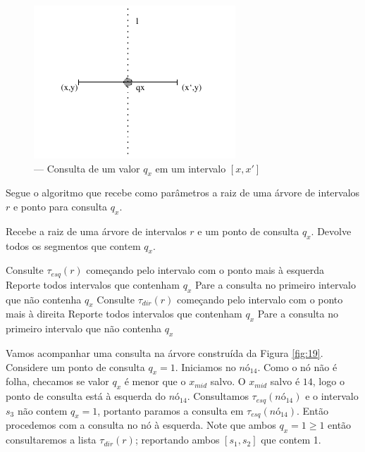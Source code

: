 \begin{figure}[h!]
    \begin{center}
        \includegraphics[scale=1.5]{images/interval_tree_query.pdf}
    \end{center}
    \caption{ — Consulta de um valor $q_x$ em um intervalo $[x, x']$}
    \label{fig:20}
\end{figure}


Segue o algoritmo que recebe como parâmetros a raiz de uma árvore de intervalos $r$ e ponto para consulta $q_x$.

\begin{algorithm}[h!]
    \caption{Recebe a raiz de uma árvore de intervalos $r$ e um ponto de consulta $q_x$. Devolve todos os segmentos que contem $q_x$.}
    \begin{algorithmic}[1]
                    \State Consulte $\tau_{esq}(r)$ começando pelo intervalo com o ponto mais à esquerda
                    \State Reporte todos intervalos que contenham $q_x$
                    \State Pare a consulta no primeiro intervalo que não contenha $q_x$
                    \State {}
                \Else
                    \State Consulte $\tau_{dir}(r)$ começando pelo intervalo com o ponto mais à direita
                    \State Reporte todos intervalos que contenham $q_x$
                    \State Pare a consulta no primeiro intervalo que não contenha $q_x$
                    \State {}
                \EndIf
            \EndIf
        \EndFunction
    \end{algorithmic}
\end{algorithm}

Vamos acompanhar uma consulta na árvore construída da Figura \ref{fig:19}. Considere um ponto de consulta $q_x=1$. Iniciamos no $nó_{14}$. Como o nó não é folha, checamos se valor $q_x$ é menor que o $x_{mid}$ salvo. O $x_{mid}$ salvo é $14$, logo o ponto de consulta está à esquerda do $nó_{14}$. Consultamos $\tau_{esq}(nó_{14})$ e o intervalo $s_3$ não contem $q_x = 1$, portanto paramos a consulta em $\tau_{esq}(nó_{14})$. Então procedemos com a consulta no nó à esquerda. Note que ambos $q_x=1 \geq 1$ então consultaremos a lista $\tau_{dir}(r)$; reportando ambos $[s_1,s_2]$ que contem 1.

